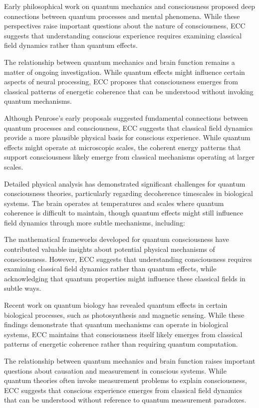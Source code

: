 \begin{refsection}
Early philosophical work on quantum mechanics and consciousness \cite{Bohm1990} proposed deep connections between quantum processes and mental phenomena. While these perspectives raise important questions about the nature of consciousness, ECC suggests that understanding conscious experience requires examining classical field dynamics rather than quantum effects.

The relationship between quantum mechanics and brain function \cite{Koch2006} remains a matter of ongoing investigation. While quantum effects might influence certain aspects of neural processing, ECC proposes that consciousness emerges from classical patterns of energetic coherence that can be understood without invoking quantum mechanisms.

Although Penrose's early proposals \cite{Penrose1989, Penrose1994} suggested fundamental connections between quantum processes and consciousness, ECC suggests that classical field dynamics provide a more plausible physical basis for conscious experience. While quantum effects might operate at microscopic scales, the coherent energy patterns that support consciousness likely emerge from classical mechanisms operating at larger scales.

Detailed physical analysis \cite{Tegmark2000} has demonstrated significant challenges for quantum consciousness theories, particularly regarding decoherence timescales in biological systems. The brain operates at temperatures and scales where quantum coherence is difficult to maintain, though quantum effects might still influence field dynamics through more subtle mechanisms, including:

The mathematical frameworks developed for quantum consciousness \cite{Hagan2002} have contributed valuable insights about potential physical mechanisms of consciousness. However, ECC suggests that understanding consciousness requires examining classical field dynamics rather than quantum effects, while acknowledging that quantum properties might influence these classical fields in subtle ways.

Recent work on quantum biology \cite{Koch2006} has revealed quantum effects in certain biological processes, such as photosynthesis and magnetic sensing. While these findings demonstrate that quantum mechanisms can operate in biological systems, ECC maintains that consciousness itself likely emerges from classical patterns of energetic coherence rather than requiring quantum computation.

The relationship between quantum mechanics and brain function \cite{Stapp2009} raises important questions about causation and measurement in conscious systems. While quantum theories often invoke measurement problems to explain consciousness, ECC suggests that conscious experience emerges from classical field dynamics that can be understood without reference to quantum measurement paradoxes.


\end{refsection}
